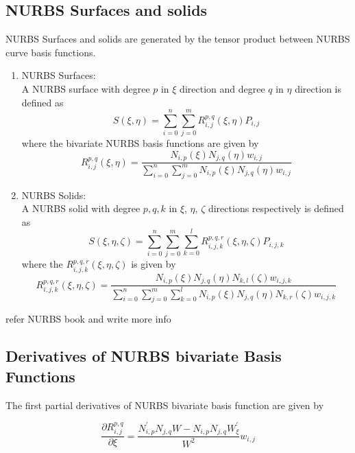 \documentclass[12pt]{article}
\begin{document}
\subsection{NURBS Surfaces and solids }
NURBS Surfaces and solids are generated by the tensor product between NURBS curve basis functions.
\begin{enumerate}[leftmargin=*]
	\item NURBS Surfaces: \\
	A NURBS surface with degree $p$ in $\xi$ direction and degree $q$ in $\eta$ direction is defined as
	\begin{equation}
	S(\xi,\eta) = \sum_{i=0}^{n}\sum_{j=0}^{m} R_{i,j}^{p,q}(\xi,\eta)  P_{i,j}
	\end{equation}
	where the bivariate NURBS basis functions are given by
	\begin{equation}
	R_{i,j}^{p,q}(\xi,\eta)  = \frac{N_{i,p}(\xi)N_{j,q}(\eta)w_{i,j}}{\sum_{i=0}^{n}\sum_{j=0}^{m}N_{i,p}(\xi)N_{j,q}(\eta)w_{i,j}}
	\end{equation}
	\item NURBS Solids: \\
	A NURBS solid with degree $p,q,k$ in $\xi$, $\eta$, $\zeta$ directions respectively is defined as
	\begin{equation}
	S(\xi,\eta,\zeta) = \sum_{i=0}^{n}\sum_{j=0}^{m}\sum_{k=0}^{l} R_{i,j,k}^{p,q,r}(\xi,\eta,\zeta)  P_{i,j,k}
	\end{equation}
	where the $R_{i,j,k}^{p,q,r}(\xi,\eta,\zeta)$ is given by
	\begin{equation}
	R_{i,j,k}^{p,q,r}(\xi,\eta,\zeta)  = \frac{N_{i,p}(\xi)N_{j,q}(\eta)N_{k,l}(\zeta)w_{i,j,k}}{\sum_{i=0}^{n}\sum_{j=0}^{m} \sum_{k=0}^{l} N_{i,p}(\xi)N_{j,q}(\eta)N_{k,r}(\zeta)w_{i,j,k}}
	\end{equation}
\end{enumerate}


refer NURBS book and write more info

\subsection{Derivatives of NURBS bivariate Basis Functions}
The first partial derivatives of NURBS bivariate basis function are given by

\begin{equation}
\frac{\partial R_{i,j}^{p,q}}{\partial \xi} = \frac{N^{'}_{i,p} N_{j,q} W - N_{i,p} N_{j,q} W^{'}_{\xi}}{W^2}w_{i,j}
\end{equation}
\end{document}
